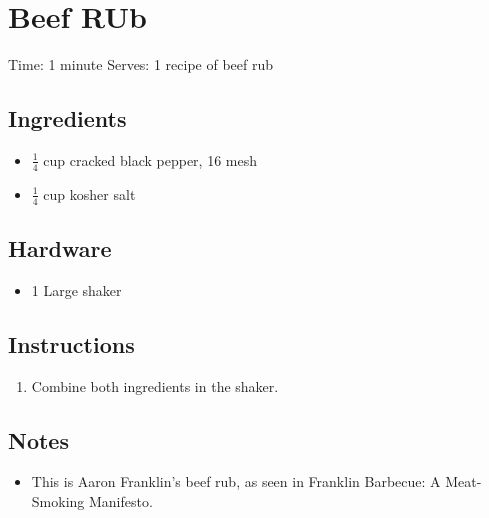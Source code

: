 \section{Beef RUb}
\label{beefRub}
\setcounter{secnumdepth}{0}
Time: 1 minute
Serves: 1 recipe of beef rub

\begin{multicols}{2}
\subsection*{Ingredients}
\begin{itemize}
    \item \( \frac{1}{4} \) cup cracked black pepper, 16 mesh
    \item \( \frac{1}{4} \) cup kosher salt
\end{itemize}

\subsection*{Hardware}
\begin{itemize}
    \item 1 Large shaker
\end{itemize}
\clearpage

\subsection*{Instructions}
\begin{enumerate}
    \item Combine both ingredients in the shaker.
\end{enumerate}

\subsection*{Notes}
\begin{itemize}
    \item This is Aaron Franklin's beef rub, as seen in Franklin Barbecue: A Meat-Smoking Manifesto.
\end{itemize}
\end{multicols}
\clearpage